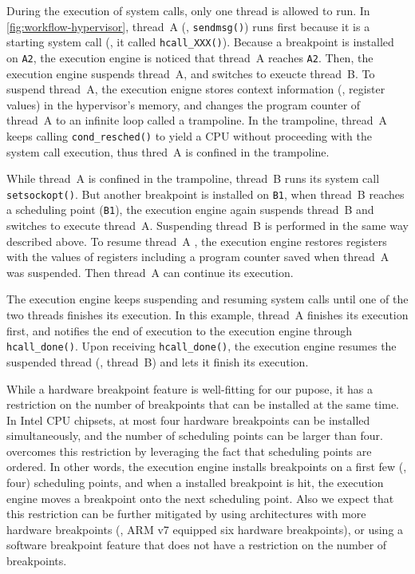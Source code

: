 

During the execution of system calls, only one thread is allowed to
run. In \autoref{fig:workflow-hypervisor}, thread~A (\ie,
\texttt{sendmsg()}) runs first because it is a starting system
call (\ie, it called \texttt{hcall_XXX()}).
%
Because a breakpoint is installed on \texttt{A2}, the execution engine
is noticed that thread~A reaches \texttt{A2}.
%
Then, the execution engine suspends thread~A, and switches to exeucte
thread~B.
%
To suspend thread~A, the execution enigne stores context information
(\eg, register values) in the hypervisor's memory, and changes the
program counter of thread~A to an infinite loop called a trampoline.
%
In the trampoline, thread~A keeps calling \texttt{cond_resched()} to
yield a CPU without proceeding with the system call execution, thus
thred~A is confined in the trampoline.
%




While thread~A is confined in the trampoline, thread~B runs its system
call \texttt{setsockopt()}.
%
But another breakpoint is installed on \texttt{B1}, when thread~B
reaches a scheduling point (\texttt{B1}), the execution engine again
suspends thread~B and switches to execute thread~A.
%
Suspending thread~B is performed in the same way described above.
%
To resume thread~A , the execution engine restores registers with the
values of registers including a program counter saved when thread~A
was suspended. Then thread~A can continue its execution.


The execution engine keeps suspending and resuming system calls until
one of the two threads finishes its execution. In this example,
thread~A finishes its execution first, and notifies the end of
execution to the execution engine through \texttt{hcall_done()}.
%
Upon receiving \texttt{hcall_done()}, the execution engine resumes the
suspended thread (\ie, thread~B) and lets it finish its execution.




%
While a hardware breakpoint feature is well-fitting for our pupose, it
has a restriction on the number of breakpoints that can be installed
at the same time.
%
In Intel CPU chipsets, at most four hardware breakpoints can be
installed simultaneously, and the number of scheduling points can be
larger than four.
%
\sys overcomes this restriction by leveraging the fact that
scheduling points are ordered. In other words, the execution engine
installs breakpoints on a first few (\eg, four) scheduling points,
and when a installed breakpoint is hit, the execution engine moves a
breakpoint onto the next scheduling point.
%
Also we expect that this restriction can be further mitigated by using
architectures with more hardware breakpoints (\eg, ARM v7 equipped six
hardware breakpoints), or using a software breakpoint feature that
does not have a restriction on the number of breakpoints.



